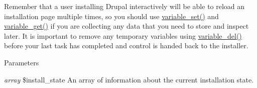Remember that a user installing Drupal interactively will be able to reload an installation page multiple times, so you should use \hyperlink{bootstrap_8inc_a9859faa6fcd56ca6048be93dace95999}{variable\_\-set()} and \hyperlink{bootstrap_8inc_a1be2160d5e5a1a9b9a0c90944c4f5252}{variable\_\-get()} if you are collecting any data that you need to store and inspect later. It is important to remove any temporary variables using \hyperlink{bootstrap_8inc_a7850bff5f313f85335f418e6d87606b1}{variable\_\-del()} before your last task has completed and control is handed back to the installer.


\begin{DoxyParams}{Parameters}
\item[{\em array}]\$install\_\-state An array of information about the current installation state.\end{DoxyParams}
